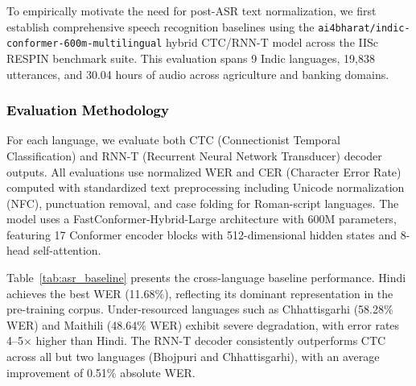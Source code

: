 To empirically motivate the need for post-ASR text normalization, we first establish comprehensive speech recognition baselines using the \texttt{ai4bharat/indic-conformer-600m-multilingual} hybrid CTC/RNN-T model across the IISc RESPIN benchmark suite. This evaluation spans 9 Indic languages, 19,838 utterances, and 30.04 hours of audio across agriculture and banking domains.

\subsubsection{\textcolor{black}{Evaluation Methodology}}

For each language, we evaluate both CTC (Connectionist Temporal Classification) and RNN-T (Recurrent Neural Network Transducer) decoder outputs. All evaluations use normalized WER and CER (Character Error Rate) computed with standardized text preprocessing including Unicode normalization (NFC), punctuation removal, and case folding for Roman-script languages. The model uses a FastConformer-Hybrid-Large architecture with 600M parameters, featuring 17 Conformer encoder blocks with 512-dimensional hidden states and 8-head self-attention.

Table~\ref{tab:asr_baseline} presents the cross-language baseline performance. Hindi achieves the best WER (11.68\%), reflecting its dominant representation in the pre-training corpus. Under-resourced languages such as Chhattisgarhi (58.28\% WER) and Maithili (48.64\% WER) exhibit severe degradation, with error rates 4--5$\times$ higher than Hindi. The RNN-T decoder consistently outperforms CTC across all but two languages (Bhojpuri and Chhattisgarhi), with an average improvement of 0.51\% absolute WER.

